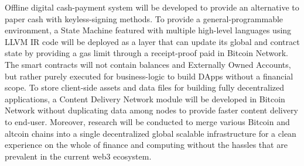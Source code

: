 \documentclass[a4paper, 10pt]{extarticle}
\begin{document}
Offline digital cash-payment system will be developed to provide an alternative to paper cash with keyless-signing methods. To provide a general-programmable environment, a State Machine \cite{wood2014ethereum} featured with multiple high-level languages using LLVM \cite{llvm} IR code will be deployed as a layer that can update its global and contract state by providing a gas limit through a receipt-proof paid in Bitcoin Network. The smart contracts will not contain balances and Externally Owned Accounts, but rather purely executed for business-logic to build DApps without a financial scope. To store client-side assets and data files for building fully decentralized applications, a Content Delivery Network module will be developed in Bitcoin Network without duplicating data among nodes to provide faster content delivery to end-user. Moreover, research will be conducted to merge various Bitcoin and altcoin chains into a single decentralized global scalable infrastructure for a clean experience on the whole of finance and computing without the hassles that are prevalent in the current web3 ecosystem.


\end{document}

